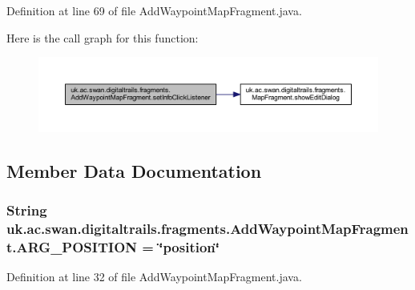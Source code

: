 Definition at line 69 of file Add\+Waypoint\+Map\+Fragment.\+java.



Here is the call graph for this function\+:\nopagebreak
\begin{figure}[H]
\begin{center}
\leavevmode
\includegraphics[width=350pt]{classuk_1_1ac_1_1swan_1_1digitaltrails_1_1fragments_1_1_add_waypoint_map_fragment_a140a606e633bd54be66aa0e554ec0f95_cgraph}
\end{center}
\end{figure}




\subsection{Member Data Documentation}
\hypertarget{classuk_1_1ac_1_1swan_1_1digitaltrails_1_1fragments_1_1_add_waypoint_map_fragment_a1546ba6c384f1a7d77c5146d42368d0a}{
\subsubsection[{A\+R\+G\+\_\+\+P\+O\+S\+I\+T\+I\+O\+N}]{\setlength{\rightskip}{0pt plus 5cm}String uk.\+ac.\+swan.\+digitaltrails.\+fragments.\+Add\+Waypoint\+Map\+Fragment.\+A\+R\+G\+\_\+\+P\+O\+S\+I\+T\+I\+O\+N = \char`\"{}position\char`\"{}\hspace{0.3cm}{\ttfamily [static]}}}\label{classuk_1_1ac_1_1swan_1_1digitaltrails_1_1fragments_1_1_add_waypoint_map_fragment_a1546ba6c384f1a7d77c5146d42368d0a}


Definition at line 32 of file Add\+Waypoint\+Map\+Fragment.\+java.

